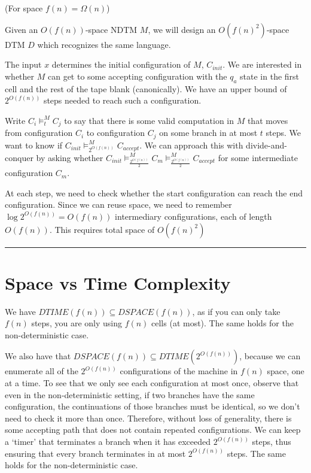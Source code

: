 \documentclass[twoside]{article}
\newenvironment{proof}{{\bf Proof:}}{\hfill\rule{2mm}{2mm}}
\begin{document}
\begin{proof}
	
	
	(For space $f(n)=\Omega(n)$)
	
	Given an $O(f(n))$-space NDTM $M$, we will design an $O(f(n)^2)$-space DTM $D$ which recognizes the same language.
	
	The input $x$ determines the initial configuration of $M$, $C_{init}$.  We are interested in whether $M$ can get to some accepting configuration with the $q_a$ state in the first cell and the rest of the tape blank (canonically).  We have an upper bound of $2^{O(f(n))}$ steps needed to reach such a configuration.
	
	Write $C_i \vDash^M_t C_j$ to say that there is some valid computation in $M$ that moves from configuration $C_i$ to configuration $C_j$ on some branch in at most $t$ steps.  We want to know if $C_{init} \vDash^M_{2^{O(f(n))}}C_{accept}$.  We can approach this with divide-and-conquer by asking whether $C_{init} \vDash^M_{\frac{2^{O(f(n))}}{2}}C_{m} \vDash^M_{\frac{2^{O(f(n))}}{2}}C_{accept}$ for some intermediate configuration $C_m$.
	
	At each step, we need to check whether the start configuration can reach the end configuration.  Since we can reuse space, we need to remember $\log2^{O(f(n))} = O(f(n))$ intermediary configurations, each of length $O(f(n))$.  This requires total space of $O(f(n)^2)$
	
	
\end{proof}



\section*{Space vs Time Complexity}

We have $DTIME(f(n))\subseteq DSPACE(f(n))$, as if you can only take $f(n)$ steps, you are only using $f(n)$ cells (at most).  The same holds for the non-deterministic case.

We also have that $DSPACE(f(n))\subseteq DTIME(2^{O(f(n))})$, because we can enumerate all of the $2^{O(f(n))}$ configurations of the machine in $f(n)$ space, one at a time.  To see that we only see each configuration at most once, observe that even in the non-deterministic setting, if two branches have the same configuration, the continuations of those branches must be identical, so we don't need to check it more than once.  Therefore, without loss of generality, there is some accepting path that does not contain repeated configurations.  We can keep a `timer' that terminates a branch when it has exceeded $2^{O(f(n))}$ steps, thus ensuring that every branch terminates in at most $2^{O(f(n))}$ steps.  The same holds for the non-deterministic case.
\end{document}
